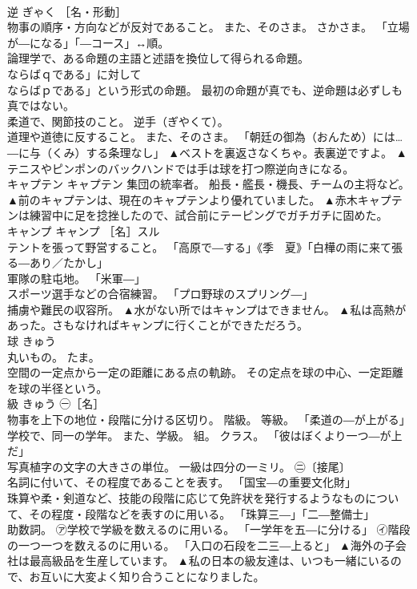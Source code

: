 \documentclass[8pt]{extreport}
\begin{document}
\begin{CJK}{UTF8}{min}
\\	逆	ぎゃく	［名・形動］ 
\\	物事の順序・方向などが反対であること。 また、そのさま。 さかさま。 「立場が―になる」「―コース」↔順。 
\\	論理学で、ある命題の主語と述語を換位して得られる命題。 
\\	ならばｑである」に対して
\\	ならばｐである」という形式の命題。 最初の命題が真でも、逆命題は必ずしも真ではない。 
\\	柔道で、関節技のこと。 逆手（ぎやくて）。 
\\	道理や道徳に反すること。 また、そのさま。 「朝廷の御為（おんため）には…―に与（くみ）する条理なし」	▲ベストを裏返さなくちゃ。表裏逆ですよ。 ▲テニスやピンポンのバックハンドでは手は球を打つ際逆向きになる。
\\	キャプテン	キャプテン	集団の統率者。 船長・艦長・機長、チームの主将など。	▲前のキャプテンは、現在のキャプテンより優れていました。 ▲赤木キャプテンは練習中に足を捻挫したので、試合前にテーピングでガチガチに固めた。
\\	キャンプ	キャンプ	［名］スル 
\\	テントを張って野営すること。 「高原で―する」《季　夏》「白樺の雨に来て張る―あり／たかし」 
\\	軍隊の駐屯地。 「米軍―」 
\\	スポーツ選手などの合宿練習。 「プロ野球のスプリング―」 
\\	捕虜や難民の収容所。	▲水がない所ではキャンプはできません。 ▲私は高熱があった。さもなければキャンプに行くことができただろう。
\\	球	きゅう	
\\	丸いもの。 たま。 
\\	空間の一定点から一定の距離にある点の軌跡。 その定点を球の中心、一定距離を球の半径という。	
\\	級	きゅう	㊀［名］ 
\\	物事を上下の地位・段階に分ける区切り。 階級。 等級。 「柔道の―が上がる」 
\\	学校で、同一の学年。 また、学級。 組。 クラス。 「彼はぼくより一つ―が上だ」 
\\	写真植字の文字の大きさの単位。 一級は四分の一ミリ。 ㊁〔接尾〕 
\\	名詞に付いて、その程度であることを表す。 「国宝―の重要文化財」 
\\	珠算や柔・剣道など、技能の段階に応じて免許状を発行するようなものについて、その程度・段階などを表すのに用いる。 「珠算三―」「二―整備士」 
\\	助数詞。 ㋐学校で学級を数えるのに用いる。 「一学年を五―に分ける」 ㋑階段の一つ一つを数えるのに用いる。 「入口の石段を二三―上ると」	▲海外の子会社は最高級品を生産しています。 ▲私の日本の級友達は、いつも一緒にいるので、お互いに大変よく知り合うことになりました。

\end{CJK}
\end{document}
